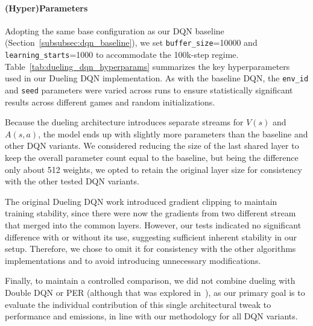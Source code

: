 \paragraph{(Hyper)Parameters}
Adopting the same base configuration as our DQN baseline (Section~\ref{subsubsec:dqn_baseline}), we set 
\texttt{buffer\_size}=\num{10000} and \texttt{learning\_starts}=\num{1000} to accommodate the 100k-step regime. 
Table~\ref{tab:dueling_dqn_hyperparams} summarizes the key hyperparameters used in our Dueling DQN implementation. As with the baseline DQN, the \texttt{env\_id} and \texttt{seed} parameters were varied across runs to ensure statistically significant results across different games and random initializations.

Because the dueling architecture introduces separate streams for $V(s)$ and $A(s,a)$, the model ends up
with slightly more parameters than the baseline and other DQN variants. We considered reducing the size of the last shared layer to keep the
overall parameter count equal to the baseline, but being the difference only about 512 weights,
we opted to retain the original layer size for consistency with the other tested DQN variants.

The original Dueling DQN work introduced gradient clipping to maintain training stability, since there were now the gradients from two different stream
that merged into the common layers. However, our tests indicated no significant difference with or without its use, suggesting sufficient inherent stability in our setup. Therefore, we chose to omit it for consistency with the other algorithms implementations and to avoid introducing unnecessary modifications.

Finally, to maintain a controlled comparison, we did not combine dueling with Double DQN or PER (although that was explored in~\cite{wang:dueling}), as our primary goal is to evaluate the individual contribution of this single architectural tweak to performance and emissions, in line with our methodology for all DQN variants.


